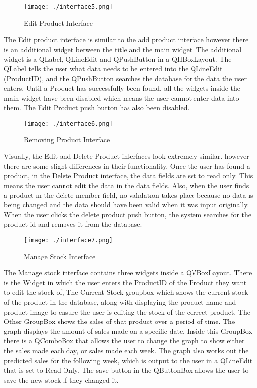 \begin{figure}[H]
    \texttt{[image: ./interface5.png]}
    \caption{Edit Product Interface} \label{fig:edit-product-interface}
\end{figure}

The Edit product interface is similar to the add product interface however there is an additional widget between the title and the main widget. The additional widget is a QLabel, QLineEdit and QPushButton in a QHBoxLayout. The QLabel tells the user what data needs to be entered into the QLineEdit (ProductID), and the QPushButton searches the database for the data the user enters. Until a Product has successfully been found, all the widgets inside the main widget have been disabled which means the user cannot enter data into them. The Edit Product push button has also been disabled.
\begin{figure}[H]
    \texttt{[image: ./interface6.png]}
    \caption{Removing Product Interface} \label{fig:removing-product-interface}
\end{figure}

Visually, the Edit and Delete Product interfaces look extremely similar. however there are some slight differences in their functionality. Once the user has found a product, in the Delete Product interface, the data fields are set to read only. This means the user cannot edit the data in the data fields. Also, when the user finds a product in the delete member field, no validation takes place because no data is being changed and the data should have been valid when it was input originally. When the user clicks the delete product push button, the system searches for the product id and removes it from the database.

\begin{figure}[H]
    \texttt{[image: ./interface7.png]}
    \caption{Manage Stock Interface} \label{fig:stock-interface}
\end{figure}

The Manage stock interface contains three widgets inside a QVBoxLayout. There is the Widget in which the user enters the ProductID of the Product they want to edit the stock of, The Current Stock groupbox which shows the current stock of the product in the database, along with displaying the product name and product image to ensure the user is editing the stock of the correct product. The Other GroupBox shows the sales of that product over a period of time. The graph displays the amount of sales made on a specific date. Inside this GroupBox there is a QComboBox that allows the user to change the graph to show either the sales made each day, or sales made each week. The graph also works out the predicted sales for the following week, which is output to the user in a QLineEdit that is set to Read Only. The save button in the QButtonBox allows the user to save the new stock if they changed it.

